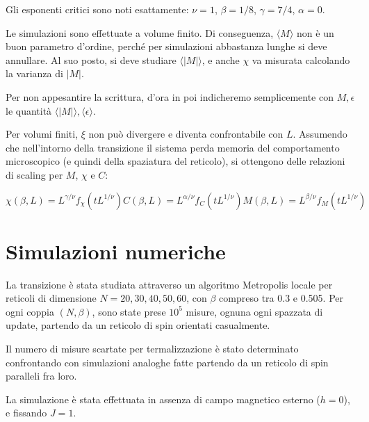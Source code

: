 \documentclass[a4paper,11pt]{article}
\newcommand{\avg}[1]{\langle {#1} \rangle}
\begin{document}
		Gli esponenti critici sono noti esattamente: $\nu = 1$, $\beta = 1/8$,
		$\gamma = 7/4$, $\alpha = 0$.

		Le simulazioni sono effettuate a volume finito. Di conseguenza, $\avg{M}$ non è un buon parametro d'ordine, perché per simulazioni abbastanza lunghe si deve annullare. Al suo posto, si deve studiare $\avg{|M|}$, e anche $\chi$ va misurata calcolando la varianza di $|M|$.
		
		Per non appesantire la scrittura, d'ora in poi indicheremo semplicemente con $M, \epsilon$ le quantità $\avg{|M|}, \avg{\epsilon}$.
		
		Per volumi finiti, $\xi$ non può divergere e diventa confrontabile
		con $L$. Assumendo che nell'intorno della transizione il sistema perda
		memoria del comportamento microscopico (e quindi della spaziatura del
		reticolo),
		si ottengono delle relazioni di scaling per $M$, $\chi$ e $C$:

		\begin{subequations}
		  \begin{equation}
			\chi(\beta, L) = L^{\gamma/\nu} f_\chi (tL^{1/\nu})
		  \end{equation}
		  \begin{equation}
			C(\beta, L) = L^{\alpha/\nu} f_C (tL^{1/\nu})
		  \end{equation}
		  \begin{equation}
			M(\beta, L) = L^{\beta/\nu} f_M(tL^{1/\nu})
		  \end{equation}
		  \label{eqn:fs_scaling}
		\end{subequations}

	\section{Simulazioni numeriche}

	La transizione è stata studiata attraverso un algoritmo Metropolis locale per
	reticoli di dimensione $N = 20,30,40,50,60$, con $\beta$ compreso tra 0.3 e
	0.505. Per ogni coppia $(N, \beta )$,
	sono state prese $10^{5}$ misure, ognuna ogni spazzata di update, partendo da un reticolo di spin orientati casualmente. 
	
	Il numero di misure scartate per termalizzazione è stato determinato confrontando con simulazioni analoghe fatte partendo da un reticolo di spin paralleli fra loro.

	La simulazione è stata effettuata in assenza di campo magnetico esterno
	($h = 0$), e fissando $J = 1$.
\end{document}
